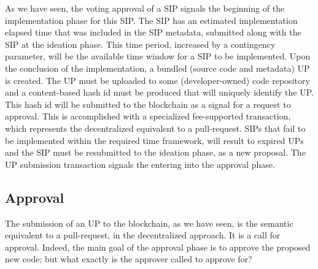 As we have seen, the voting approval of a SIP signals the beginning of the implementation phase for this SIP. The SIP has an estimated implementation elapsed time that was included in the SIP metadata, submitted along with the SIP at the ideation phase. This time period, increased by a contingency parameter, will be the available time window for a SIP to be implemented. Upon the conclusion of the implementation, a bundled (source code and metadata) UP is created. The UP must be uploaded to some (developer-owned) code repository and a content-based hash id must be produced that will uniquely identify the UP. This hash id will be submitted to the blockchain as a signal for a request to approval. This is accomplished with a specialized fee-supported  transaction, which represents the decentralized equivalent to a pull-request. SIPs that fail to be implemented within the required time framework, will result to expired UPs and the SIP must be resubmitted to the ideation phase, as a new proposal. The UP submission transaction signals the entering into the approval phase.


\subsection{Approval}



The submission of an UP to the blockchain, as we have seen, is the semantic equivalent to a pull-request, in the decentralized approach. It is a call for approval. Indeed, the main goal of the approval phase is to approve the proposed new code; but what exactly is the approver called to approve for?

